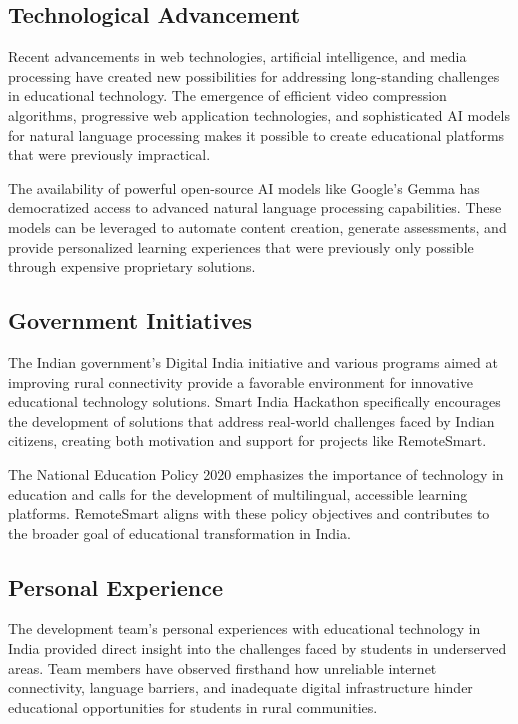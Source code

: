 \documentclass[12pt,a4paper]{report}
\begin{document}
\subsection{Technological Advancement}

Recent advancements in web technologies, artificial intelligence, and media processing have created new possibilities for addressing long-standing challenges in educational technology. The emergence of efficient video compression algorithms, progressive web application technologies, and sophisticated AI models for natural language processing makes it possible to create educational platforms that were previously impractical.

The availability of powerful open-source AI models like Google's Gemma has democratized access to advanced natural language processing capabilities. These models can be leveraged to automate content creation, generate assessments, and provide personalized learning experiences that were previously only possible through expensive proprietary solutions.

\subsection{Government Initiatives}

The Indian government's Digital India initiative and various programs aimed at improving rural connectivity provide a favorable environment for innovative educational technology solutions. Smart India Hackathon specifically encourages the development of solutions that address real-world challenges faced by Indian citizens, creating both motivation and support for projects like RemoteSmart.

The National Education Policy 2020 emphasizes the importance of technology in education and calls for the development of multilingual, accessible learning platforms. RemoteSmart aligns with these policy objectives and contributes to the broader goal of educational transformation in India.

\subsection{Personal Experience}

The development team's personal experiences with educational technology in India provided direct insight into the challenges faced by students in underserved areas. Team members have observed firsthand how unreliable internet connectivity, language barriers, and inadequate digital infrastructure hinder educational opportunities for students in rural communities.
\end{document}
